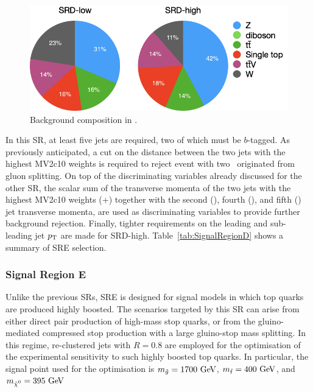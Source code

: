 				\begin{figure}[t]
				  \begin{center}
				   \includegraphics[width=.7\textwidth]{figures/stop/piechart_SRDcomp}
				   \caption{Background composition in \SRD.}
				   \label{fig:SRD_bkgcomp}
				  \end{center}
				\end{figure}

				In this \ac{SR}, at least five jets are required, two of which must be $b$-tagged. As previously anticipated, a cut on the distance between the two jets with the highest MV2c10 weights is required to reject event with two \bjs\ originated from gluon splitting. On top of the discriminating variables already discussed for the other \ac{SR}, the scalar sum of the transverse momenta of the two jets with the highest MV2c10 weights (\ptbzero+\ptbone) together with the second (\ptone), fourth (\ptthree), and fifth (\ptfour) jet transverse momenta, are used as discriminating variables to provide further background rejection. Finally, tighter requirements on the leading and sub-leading jet $p_{\mathrm{T}}$ are made for SRD-high. Table~\ref{tab:SignalRegionD} shows a summary of SRE selection.






			\subsubsection*{Signal Region E}


				Unlike the previous \acp{SR}, SRE is designed for signal models in which top quarks are produced highly boosted. The scenarios targeted by this \ac{SR} can arise from either direct pair production of high-mass stop quarks, or from the gluino-mediated compressed stop production with a large gluino-stop mass splitting. In this regime, re-clustered jets with $R=0.8$ are employed for the optimisation of the experimental sensitivity to such highly boosted top quarks. In particular, the signal point used for the optimisation is $m_{\gluino} = 1700 \GeV$, $\mstop=400\GeV$, and $\mLSP=395\GeV$

